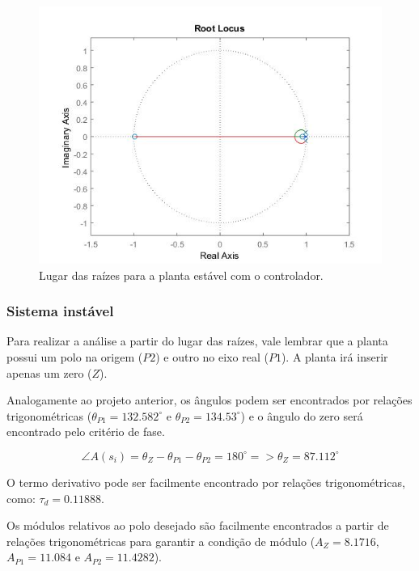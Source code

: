 \begin{figure}[H]
\begin{center}
\includegraphics[width=12cm]{images/RL/RL_est_C.jpg}
\caption{Lugar das raízes para a planta estável com o controlador.}
\label{rl:ins:c} 
\end{center}
\end{figure}

\subsubsection{Sistema instável}

Para realizar a análise a partir do lugar das raízes, vale lembrar que a planta possui um polo na origem ($P2$) e outro no eixo real ($P1$). A planta irá inserir apenas um zero ($Z$).

Analogamente ao projeto anterior, os ângulos podem ser encontrados por relações trigonométricas ($\theta_{P1} = 132.582^{\circ}$ e $\theta_{P2} = 134.53^{\circ}$) e o ângulo do zero será encontrado pelo critério de fase.

\begin{equation} \label{pid:6}
    \angle A(s_i) = \theta_Z - \theta_{P1} - \theta_{P2} = 180^{\circ} => \theta_Z = 87.112^{\circ}
\end{equation}

O termo derivativo pode ser facilmente encontrado por relações trigonométricas, como: $\tau_d = 0.11888$.

Os módulos relativos ao polo desejado são facilmente encontrados a partir de relações trigonométricas para garantir a condição de módulo ($A_Z = 8.1716$, $A_{P1} = 11.084$ e $A_{P2} = 11.4282$).

